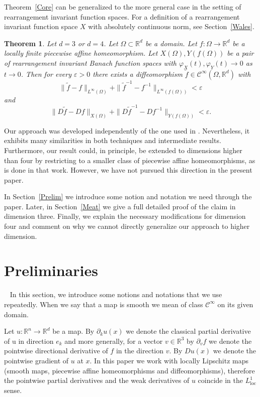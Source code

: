 \documentclass[12pt,a4paper]{amsart}
\theoremstyle{plain}
\newtheorem{thmx}{Theorem}
\theoremstyle{definition}
\numberwithin{equation}{section}
\def\loc{\operatorname{loc}}
\def\phi{\varphi}
\def\epsilon{\varepsilon}
\def\er{\mathbb R}
\def\rn{\mathbb R^n}
\begin{document}
	Theorem~\ref{Core} can be generalized to the more general case in the setting of rearrangement invariant function spaces. For a definition of a rearrangement invariant function space $X$ with absolutely continuous norm, see Section~\ref{Wales}.
	
	\begin{thmx}\label{main}
		Let $d=3$ or $d=4$. Let $\Omega\subset\er^d$ be a domain. Let $f:\Omega\to\er^d$ be a locally finite piecewise affine homeomorphism. Let $X(\Omega), Y(f(\Omega))$ be a pair of rearrangement invariant Banach function spaces with $\phi_X(t), \phi_Y(t) \to 0$ as $t\to 0$. Then for every $\epsilon>0$ there exists a diffeomorphism $\tilde{f} \in \mathcal{C}^{\infty}(\Omega, \er^d)$ with 
		$$
		\|\tilde{f} - f\|_{L^{\infty}(\Omega)}  + \|\tilde{f}^{-1} - f^{-1}\|_{L^{\infty}(f(\Omega))} < \epsilon
		$$
		and
		$$
		\|D\tilde{f} - Df\|_{X(\Omega)} + \|D\tilde{f}^{-1} - Df^{-1}\|_{Y(f(\Omega))} < \epsilon.
		$$
	\end{thmx}
	
	Our approach was developed independently of the one used in \cite{Munk}. Nevertheless, it exhibits many similarities in both techniques and intermediate results. Furthermore, our result could, in principle, be extended to dimensions higher than four by restricting to a smaller class of piecewise affine homeomorphisms, as is done in that work. However, we have not pursued this direction in the present paper.
	
	
	In Section~\ref{Prelim} we introduce some notion and notation we need through the paper. Later, in Section~\ref{Meat} we give a full detailed proof of the claim in dimension three. Finally, we explain the necessary modifications for dimension four and comment on why we cannot directly generalize our approach to higher dimension.
	
	
	\section{Preliminaries}~\label{Prelim}
	In this section, we introduce some notions and notations that we use repeatedly. When we say that a map is smooth we mean of class $\mathcal{C}^{\infty}$ on its given domain.
	
	Let $u:\rn \to \er^d$ be a map. By $\partial_ku(x)$ we denote the classical partial derivative of u in direction $e_k$ and more generally, for a vector $v\in\er^3$ by $\partial_v f$ we denote the pointwise directional derivative of $f$ in the direction $v$. By $Du(x)$ we denote the pointwise gradient of $u$ at $x$. In this paper we work with locally Lipschitz maps (smooth maps, piecewise affine homeomorphisms and diffeomorphisms), therefore the pointwise partial derivatives and the weak derivatives of $u$ coincide in the $L^{1}_{\loc}$ sense.
	
\end{document}

